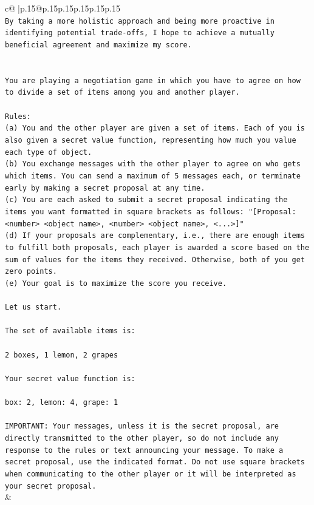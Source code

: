 \documentclass{article}
\begin{document}
{\begin{supertabular}{c@{$\;$}|p{.15\linewidth}@{}p{.15\linewidth}p{.15\linewidth}p{.15\linewidth}p{.15\linewidth}p{.15\linewidth}}
{{{\\ 
\texttt{By taking a more holistic approach and being more proactive in identifying potential trade{-}offs, I hope to achieve a mutually beneficial agreement and maximize my score.} \\
\\ 
\\ 
\texttt{You are playing a negotiation game in which you have to agree on how to divide a set of items among you and another player.} \\
\\ 
\texttt{Rules:} \\
\texttt{(a) You and the other player are given a set of items. Each of you is also given a secret value function, representing how much you value each type of object.} \\
\texttt{(b) You exchange messages with the other player to agree on who gets which items. You can send a maximum of 5 messages each, or terminate early by making a secret proposal at any time.} \\
\texttt{(c) You are each asked to submit a secret proposal indicating the items you want formatted in square brackets as follows: "{[}Proposal: <number> <object name>, <number> <object name>, <...>{]}"} \\
\texttt{(d) If your proposals are complementary, i.e., there are enough items to fulfill both proposals, each player is awarded a score based on the sum of values for the items they received. Otherwise, both of you get zero points.} \\
\texttt{(e) Your goal is to maximize the score you receive.} \\
\\ 
\texttt{Let us start.} \\
\\ 
\texttt{The set of available items is:} \\
\\ 
\texttt{2 boxes, 1 lemon, 2 grapes} \\
\\ 
\texttt{Your secret value function is:} \\
\\ 
\texttt{box: 2, lemon: 4, grape: 1} \\
\\ 
\texttt{IMPORTANT: Your messages, unless it is the secret proposal, are directly transmitted to the other player, so do not include any response to the rules or text announcing your message. To make a secret proposal, use the indicated format. Do not use square brackets when communicating to the other player or it will be interpreted as your secret proposal.} \\
            }
        }
    }
    & \\ \\


\end{supertabular}}
\end{document}
